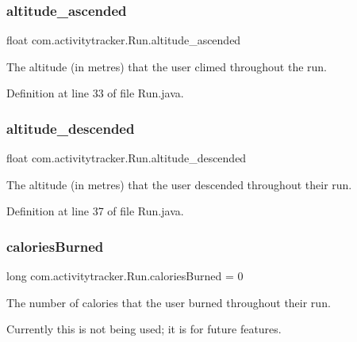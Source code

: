 \subsubsection{\texorpdfstring{altitude\+\_\+ascended}{altitude\_ascended}}
{\footnotesize\ttfamily float com.\+activitytracker.\+Run.\+altitude\+\_\+ascended\hspace{0.3cm}{\ttfamily [package]}}

The altitude (in metres) that the user climed throughout the run. 

Definition at line 33 of file Run.\+java.

\mbox{\label{classcom_1_1activitytracker_1_1_run_a26cd078680ee374482ce848b90308dda}} 
\subsubsection{\texorpdfstring{altitude\+\_\+descended}{altitude\_descended}}
{\footnotesize\ttfamily float com.\+activitytracker.\+Run.\+altitude\+\_\+descended\hspace{0.3cm}{\ttfamily [package]}}

The altitude (in metres) that the user descended throughout their run. 

Definition at line 37 of file Run.\+java.

\mbox{\label{classcom_1_1activitytracker_1_1_run_aa4c73467653a47d3b14ff6653bbab853}} 
\subsubsection{\texorpdfstring{calories\+Burned}{caloriesBurned}}
{\footnotesize\ttfamily long com.\+activitytracker.\+Run.\+calories\+Burned = 0\hspace{0.3cm}{\ttfamily [package]}}

The number of calories that the user burned throughout their run.

Currently this is not being used; it is for future features. 

